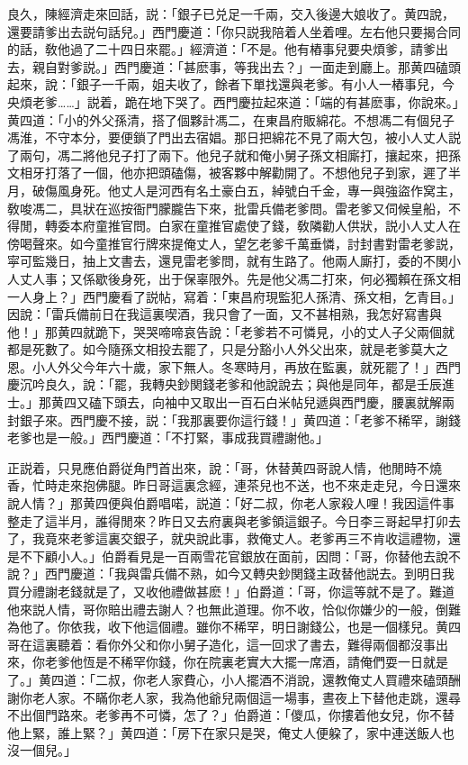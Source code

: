 良久，陳經濟走來回話，説：「銀子已兑足一千兩，交入後邊大娘收了。黄四說，還要請爹出去説句話兒。」西門慶道：「你只説我陪着人坐着哩。左右他只要揭合同的話，敎他過了二十四日來罷。」經濟道：「不是。他有樁事兒要央煩爹，請爹出去，親自對爹説。」西門慶道：「甚麽事，等我出去？」一面走到廳上。那黄四磕頭起來，說：「銀子一千兩，姐夫收了，餘者下單找還與老爹。有小人一樁事兒，今央煩老爹……」説着，跪在地下哭了。西門慶拉起來道：「端的有甚麽事，你說來。」黄四道：「小的外父孫清，搭了個夥計馮二，在東昌府販綿花。不想馮二有個兒子馮淮，不守本分，要便鎖了門出去宿娼。那日把綿花不見了兩大包，被小人丈人説了兩句，馮二將他兒子打了兩下。他兒子就和俺小舅子孫文相廝打，攘起來，把孫文相牙打落了一個，他亦把頭磕傷，被客夥中解勸開了。不想他兒子到家，遲了半月，破傷風身死。他丈人是河西有名土豪白五，綽號白千金，專一與強盜作窝主，敎唆馮二，具狀在巡按衙門朦朧告下來，批雷兵備老爹問。雷老爹又伺候皇船，不得閒，轉委本府童推官問。白家在童推官處使了錢，敎隣勸人供狀，説小人丈人在傍喝聲來。如今童推官行牌來提俺丈人，望乞老爹千萬垂憐，討封書對雷老爹説，寜可監幾日，抽上文書去，還見雷老爹問，就有生路了。他兩人廝打，委的不関小人丈人事；又係歇後身死，出于保辜限外。先是他父馮二打來，何必獨賴在孫文相一人身上？」西門慶看了説帖，寫着：「東昌府現監犯人孫清、孫文相，乞青目。」因說：「雷兵備前日在我這裏喫酒，我只會了一面，又不甚相熟，我怎好寫書與他！」那黄四就跪下，哭哭啼啼哀告說：「老爹若不可憐見，小的丈人子父兩個就都是死數了。如今隨孫文相投去罷了，只是分豁小人外父出來，就是老爹莫大之恩。小人外父今年六十歲，家下無人。冬寒時月，再放在監裏，就死罷了！」西門慶沉吟良久，說：「罷，我轉央鈔関錢老爹和他說說去；與他是同年，都是壬辰進士。」那黄四又磕下頭去，向袖中又取出一百石白米帖兒遞與西門慶，腰裏就解兩封銀子來。西門慶不接，説：「我那裏要你這行錢！」黄四道：「老爹不稀罕，謝錢老爹也是一般。」西門慶道：「不打緊，事成我買禮謝他。」

正説着，只見應伯爵従角門首出來，說：「哥，休替黄四哥說人情，他閒時不燒香，忙時走來抱佛腿。昨日哥這裏念經，連茶兒也不送，也不來走走兒，今日還來說人情？」那黄四便與伯爵唱喏，説道：「好二叔，你老人家殺人哩！我因這件事整走了這半月，誰得閒來？昨日又去府裏與老爹領這銀子。今日李三哥起早打卯去了，我竟來老爹這裏交銀子，就央說此事，救俺丈人。老爹再三不肯收這禮物，還是不下顧小人。」伯爵看見是一百兩雪花官銀放在面前，因問：「哥，你替他去說不說？」西門慶道：「我與雷兵備不熟，如今又轉央鈔関錢主政替他説去。到明日我買分禮謝老錢就是了，又收他禮做甚麽！」伯爵道：「哥，你這等就不是了。難道他來説人情，哥你賠出禮去謝人？也無此道理。你不收，恰似你嫌少的一般，倒難為他了。你依我，收下他這個禮。雖你不稀罕，明日謝錢公，也是一個樣兒。黄四哥在這裏聽着：看你外父和你小舅子造化，這一回求了書去，難得兩個都沒事出來，你老爹他恆是不稀罕你錢，你在院裏老實大大擺一席酒，請俺們耍一日就是了。」黄四道：「二叔，你老人家費心，小人擺酒不消說，還教俺丈人買禮來磕頭酬謝你老人家。不瞞你老人家，我為他爺兒兩個這一場事，晝夜上下替他走跳，還尋不出個門路來。老爹再不可憐，怎了？」伯爵道：「儍瓜，你摟着他女兒，你不替他上緊，誰上緊？」黄四道：「房下在家只是哭，俺丈人便躱了，家中連送飯人也沒一個兒。」

